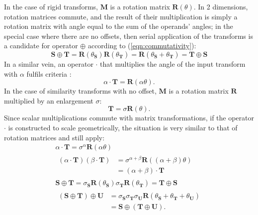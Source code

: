     
        In the case of rigid transforms, $\mathbf{M}$ is a rotation matrix $\mathbf{R}(\theta)$. In 2 dimensions, rotation matrices commute, and the result of their multiplication is simply a rotation matrix with angle equal to the sum of the operands' angles; in the special case where there are no offsets, then serial application of the transforms is a candidate for operator $\oplus$ according to (\ref{eqn:commutativity}):
       \begin{equation}
           \mathbf{S} \oplus \mathbf{T} = \mathbf{R}(\theta_\mathbf{S})\mathbf{R}(\theta_\mathbf{T}) = \mathbf{R}(\theta_\mathbf{S} + \theta_\mathbf{T}) = \mathbf{T} \oplus \mathbf{S}
       \end{equation}
       In a similar vein, an operator $\cdot$ that multiplies the angle of the input transform with $\alpha$ fulfils criteria :
        \begin{equation}
            \alpha \cdot \mathbf{T} = \mathbf{R}(\alpha\theta).
        \end{equation}
            In the case of similarity transforms with no offset, $\mathbf{M}$ is a rotation matrix $\mathbf{R}$ multiplied by an enlargement $\sigma$:
            \begin{equation}
                  \mathbf{T} = \sigma\mathbf{R}(\theta).
            \end{equation}
            Since scalar multiplications commute with matrix transformations, if the operator $\cdot$ is constructed to scale geometrically, the situation is very similar to that of rotation matrices and  still apply:
            \begin{gather}
                \alpha \cdot \mathbf{T} = \sigma^{\alpha}\mathbf{R}(\alpha\theta) \\
                \begin{split}
                    (\alpha \cdot \mathbf{T})(\beta \cdot \mathbf{T}) &= \sigma^{\alpha + \beta}\mathbf{R}((\alpha + \beta)\theta) \\
                                                                      &= (\alpha + \beta) \cdot \mathbf{T}
                \end{split} \\
                \mathbf{S} \oplus \mathbf{T} = \sigma_\mathbf{S}\mathbf{R}(\theta_\mathbf{S})\sigma_\mathbf{T}\mathbf{R}(\theta_\mathbf{T}) = \mathbf{T} \oplus \mathbf{S} \\
                \begin{split}
                   (\mathbf{S} \oplus \mathbf{T}) \oplus \mathbf{U} &= \sigma_\mathbf{S}\sigma_\mathbf{T}\sigma_\mathbf{U}\mathbf{R}(\theta_\mathbf{S} + \theta_\mathbf{T} + \theta_\mathbf{U}) \\
                                                                     &= \mathbf{S} \oplus (\mathbf{T} \oplus \mathbf{U}).
                \end{split}
            \end{gather}
